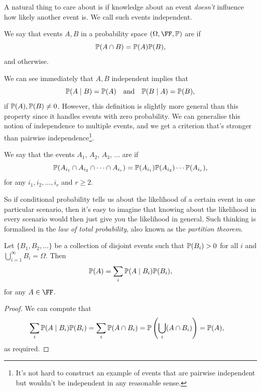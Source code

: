 \documentclass[a4paper]{scrartcl}
\begin{document}
A natural thing to care about is if knowledge about an event \emph{doesn't} influence how likely another event is. We call such events independent.

\begin{definition}
We say that events $A, B$ in a probability space $(\Omega, \FF, \PP)$ are  if
$$
\mathbb{P}(A \cap B) = \mathbb{P}(A) \mathbb{P}(B),
$$
and  otherwise.
\end{definition}

We can see immediately that $A, B$ independent implies that
$$
\mathbb{P}(A \mid B) = \mathbb{P}(A) \quad \text{and} \quad \mathbb{P}(B \mid A) = \mathbb{P}(B),
$$
if $\mathbb{P}(A), \mathbb{P}(B) \neq 0$. However, this definition is slightly more general than this property since it handles events with zero probability.
We can generalise this notion of independence to multiple events, and we get a criterion that's stronger than pairwise independence\footnote{It's not hard to construct an example of events that are pairwise independent but wouldn't be independent in any reasonable sense.}.

\begin{definition}
	We say that the events $A_1$, $A_2$, $A_3$, $\dots$ are  if
	$$
	\mathbb{P}(A_{i_1} \cap A_{i_2} \cap \cdots \cap A_{i_r}) = \mathbb{P}(A_{i_1}) \mathbb{P}(A_{i_2}) \cdots \mathbb{P}(A_{i_r}),
	$$
	for any $i_1, i_2, \dots, i_r$ and $r \geq 2$.
\end{definition}

So if conditional probability tells us about the likelihood of a certain event in one particular scenario, then it's easy to imagine that knowing about the likelihood in every scenario would then just give you the likelihood in general. Such thinking is formalised in the \emph{law of total probability}, also known as the \emph{partition theorem}.

\begin{theorem}
	Let $\{B_1, B_2, \dots\}$ be a collection of disjoint events such that $\mathbb{P}(B_i) > 0$ for all $i$ and $\bigcup_{i = 1}^{\infty} B_i = \Omega$. Then
	$$
	\mathbb{P}(A) = \sum_i \mathbb{P}(A \mid B_i) \mathbb{P}(B_i),
	$$
	for any $A \in \FF$.
\end{theorem}
\begin{proof}
	We can compute that
	\begin{align*}
		\sum_{i} \mathbb{P}(A \mid B_i) \mathbb{P}(B_i) &= \sum_i \mathbb{P}(A \cap B_i) = \mathbb{P}\left(\bigcup_i (A \cap B_i)\right) = \mathbb{P}(A),
	\end{align*}
	as required.
\end{proof}
\end{document}

